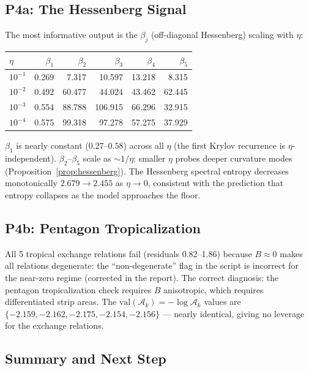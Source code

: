 \documentclass[11pt]{amsart}
\begin{document}
\subsection{P4a: The Hessenberg Signal}

The most informative output is the $\beta_j$ (off-diagonal Hessenberg)
scaling with $\eta$:

\begin{center}
\small
\begin{tabular}{@{}lrrrrr@{}}
\toprule
$\eta$ & $\beta_1$ & $\beta_2$ & $\beta_3$ & $\beta_4$ & $\beta_5$ \\
\midrule
$10^{-1}$ & 0.269 & 7.317  & 10.597 & 13.218 & 8.315 \\
$10^{-2}$ & 0.492 & 60.477 & 44.024 & 43.462 & 62.445 \\
$10^{-3}$ & 0.554 & 88.788 & 106.915 & 66.296 & 32.915 \\
$10^{-4}$ & 0.575 & 99.318 & 97.278  & 57.275 & 37.929 \\
\bottomrule
\end{tabular}
\end{center}

$\beta_1$ is nearly constant ($0.27$--$0.58$) across all $\eta$
(the first Krylov recurrence is $\eta$-independent).
$\beta_2$--$\beta_5$ scale as $\sim 1/\eta$: smaller $\eta$ probes
deeper curvature modes (Proposition~\ref{prop:hessenberg}).
The Hessenberg spectral entropy decreases monotonically
$2.679 \to 2.455$ as $\eta \to 0$, consistent with the prediction
that entropy collapses as the model approaches the floor.

\subsection{P4b: Pentagon Tropicalization}

All 5 tropical exchange relations fail (residuals 0.82--1.86)
because $B \approx 0$ makes all relations degenerate:
the ``non-degenerate'' flag in the script is incorrect for the
near-zero regime (corrected in the report).
The correct diagnosis: the pentagon tropicalization check requires
$B$ anisotropic, which requires differentiated strip areas.
The $\mathrm{val}(\mathcal{A}_k) = -\log \mathcal{A}_k$ values
are $\{-2.159, -2.162, -2.175, -2.154, -2.156\}$ --- nearly
identical, giving no leverage for the exchange relations.

\subsection{Summary and Next Step}
\end{document}
